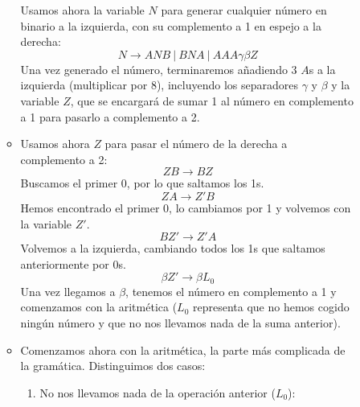 \begin{ejercicio}
\begin{enumerate}
\begin{description}
\begin{itemize}
\begin{itemize}
                            \end{itemize}
                            Usamos ahora la variable $N$ para generar cualquier número en binario a la izquierda, con su complemento a 1 en espejo a la derecha:
                            \begin{equation*}
                                N \rightarrow ANB\ |\ BNA\ |\ AAA\gamma\beta Z
                            \end{equation*}
                            Una vez generado el número, terminaremos añadiendo 3 $A$s a la izquierda (multiplicar por 8), incluyendo los separadores $\gamma$ y $\beta$ y la variable $Z$, que se encargará de sumar 1 al número en complemento a 1 para pasarlo a complemento a 2.
                        \item Usamos ahora $Z$ para pasar el número de la derecha a complemento a 2:
                            \begin{equation*}
                                ZB \rightarrow BZ
                            \end{equation*}
                            Buscamos el primer 0, por lo que saltamos los 1s.
                            \begin{equation*}
                                ZA \rightarrow Z'B
                            \end{equation*}
                            Hemos encontrado el primer 0, lo cambiamos por 1 y volvemos con la variable $Z'$.
                            \begin{equation*}
                                BZ' \rightarrow Z'A
                            \end{equation*}
                            Volvemos a la izquierda, cambiando todos los 1s que saltamos anteriormente por 0s.
                            \begin{equation*}
                                \beta Z'\rightarrow\beta L_0
                            \end{equation*}
                            Una vez llegamos a $\beta$, tenemos el número en complemento a 1 y comenzamos con la aritmética ($L_0$ representa que no hemos cogido ningún número y que no nos llevamos nada de la suma anterior).
                        \item Comenzamos ahora con la aritmética, la parte más complicada de la gramática. Distinguimos dos casos:
                            \begin{enumerate}
                                \item No nos llevamos nada de la operación anterior ($L_0$):

\end{enumerate}
\end{itemize}
\end{description}
\end{enumerate}
\end{ejercicio}
